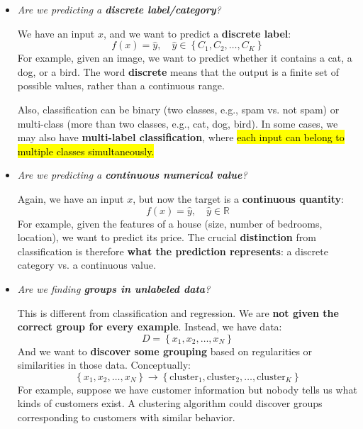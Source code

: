 \begin{itemize}
    \item {}
        \begin{center}
            \emph{Are we predicting a \textbf{discrete label/category}?}
        \end{center}
        We have an input $x$, and we want to predict a \textbf{discrete label}:
        \begin{equation*}
            f(x) = \hat{y}, \quad \hat{y} \in \left\{C_{1}, C_{2}, \ldots, C_{K}\right\}
        \end{equation*}
        For example, given an image, we want to predict whether it contains a cat, a dog, or a bird. The word \textbf{discrete} means that the output is a finite set of possible values, rather than a continuous range.

        \highspace
        Also, classification can be binary (two classes, e.g., spam vs. not spam) or multi-class (more than two classes, e.g., cat, dog, bird). In some cases, we may also have \textbf{multi-label classification}, where \hl{each input can belong to multiple classes simultaneously.}

    \item {}
        \begin{center}
            \emph{Are we predicting a \textbf{continuous numerical value}?}
        \end{center}
        Again, we have an input $x$, but now the target is a \textbf{continuous quantity}:
        \begin{equation*}
            f(x) = \hat{y}, \quad \hat{y} \in \mathbb{R}
        \end{equation*}
        For example, given the features of a house (size, number of bedrooms, location), we want to predict its price. The crucial \textbf{distinction} from classification is therefore \textbf{what the prediction represents}: a discrete category vs. a continuous value.

    \item {}
        \begin{center}
            \emph{Are we finding \textbf{groups in unlabeled data}?}
        \end{center}
        This is different from classification and regression. We are \textbf{not given the correct group for every example}. Instead, we have data:
        \begin{equation*}
            D = \left\{x_1, x_2, \ldots, x_N\right\}
        \end{equation*}
        And we want to \textbf{discover some grouping} based on regularities or similarities in those data. Conceptually:
        \begin{equation*}
            \left\{x_1, x_2, \ldots, x_N\right\} \to \left\{\text{cluster}_{1}, \text{cluster}_{2}, \ldots, \text{cluster}_{K}\right\}
        \end{equation*}
        For example, suppose we have customer information but nobody tells us what kinds of customers exist. A clustering algorithm could discover groups corresponding to customers with similar behavior.


\end{itemize}
